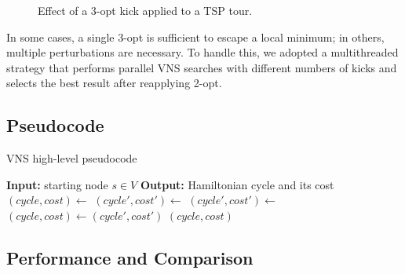 \begin{figure}[h]
\begin{subfigure}[c]{.4\textwidth}
{
        }
    \end{subfigure}
    \caption{Effect of a 3-opt kick applied to a TSP tour.}
    \label{fig:3optkick}
\end{figure}

In some cases, a single 3-opt is sufficient to escape a local minimum; in others, multiple perturbations are necessary. 
To handle this, we adopted a multithreaded strategy that performs parallel VNS searches with different numbers of kicks and selects 
the best result after reapplying 2-opt.

\subsection{Pseudocode}

\begin{algorithm}
\caption{VNS high-level pseudocode}
\label{alg:vns_highlevel}
\begin{algorithmic}
\State \textbf{Input:} starting node $s \in V$
\State \textbf{Output:} Hamiltonian cycle and its cost
\State
\State $(cycle, cost) \gets$ 
    \State $(cycle', cost') \gets$ 
    \State $(cycle', cost') \gets$ 
        \State $(cycle, cost) \gets (cycle', cost')$
    \EndIf
\EndWhile
\State \Return $(cycle, cost)$
\end{algorithmic}
\end{algorithm}

\subsection{Performance and Comparison}

